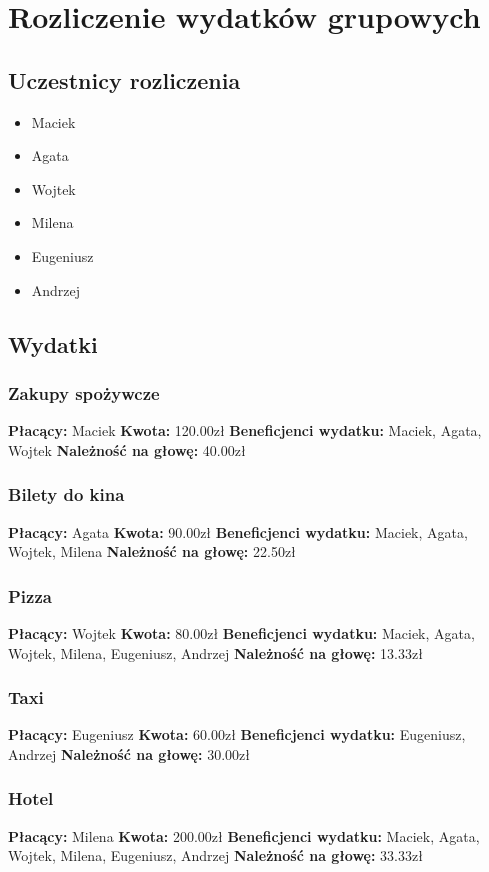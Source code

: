 \documentclass{report}
\begin{document}
\section*{Rozliczenie wydatków grupowych}
\subsection*{Uczestnicy rozliczenia}
\begin{itemize}
\item Maciek
\item Agata
\item Wojtek
\item Milena
\item Eugeniusz
\item Andrzej
\end{itemize}
\subsection*{Wydatki}
\subsubsection*{Zakupy spożywcze}
\textbf{Płacący: } Maciek
\textbf{Kwota: } 120.00zł
\textbf{Beneficjenci wydatku: }Maciek, Agata, Wojtek  
 \textbf{Należność na głowę: } 40.00zł
\subsubsection*{Bilety do kina}
\textbf{Płacący: } Agata
\textbf{Kwota: } 90.00zł
\textbf{Beneficjenci wydatku: }Maciek, Agata, Wojtek, Milena  
 \textbf{Należność na głowę: } 22.50zł
\subsubsection*{Pizza}
\textbf{Płacący: } Wojtek
\textbf{Kwota: } 80.00zł
\textbf{Beneficjenci wydatku: }Maciek, Agata, Wojtek, Milena, Eugeniusz, Andrzej  
 \textbf{Należność na głowę: } 13.33zł
\subsubsection*{Taxi}
\textbf{Płacący: } Eugeniusz
\textbf{Kwota: } 60.00zł
\textbf{Beneficjenci wydatku: }Eugeniusz, Andrzej  
 \textbf{Należność na głowę: } 30.00zł
\subsubsection*{Hotel}
\textbf{Płacący: } Milena
\textbf{Kwota: } 200.00zł
\textbf{Beneficjenci wydatku: }Maciek, Agata, Wojtek, Milena, Eugeniusz, Andrzej  
 \textbf{Należność na głowę: } 33.33zł
\end{document}
